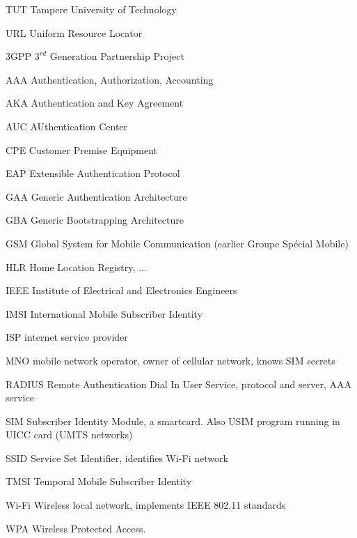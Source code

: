 \documentclass[12pt,a4paper,english]{tutthesis}
\begin{document}
\begin{termlist}
\item [TUT]    Tampere University of Technology
\item [URL]    Uniform Resource Locator
\item[3GPP] $3^{rd}$ Generation Partnership Project
\item[AAA] Authentication, Authorization, Accounting
\item[AKA] Authentication and Key Agreement %
\item[AUC] AUthentication Center
\item[CPE] Customer Premise Equipment %
\item[EAP] Extensible Authentication Protocol %
\item[GAA] Generic Authentication Architecture %
\item[GBA] Generic Bootstrapping Architecture
\item[GSM] Global System for Mobile Communication (earlier Groupe Spécial Mobile)
\item[HLR] Home Location Registry, ...
\item[IEEE] Institute of Electrical and Electronics Engineers
\item[IMSI] International Mobile Subscriber Identity
\item[ISP] internet service provider
\item[MNO] mobile network operator, owner of cellular network, knows SIM secrets
\item[RADIUS] Remote Authentication Dial In User Service, protocol and server,  AAA service 
\item[SIM]  Subscriber Identity Module, a smartcard. Also USIM program running in UICC card (UMTS networks)
\item[SSID] Service Set Identifier, identifies Wi-Fi network
\item[TMSI] Temporal Mobile Subscriber Identity
\item[Wi-Fi] Wireless local network, implements IEEE 802.11 standards
\item[WPA] Wireless Protected Access.
\end{termlist} 
\end{document}
